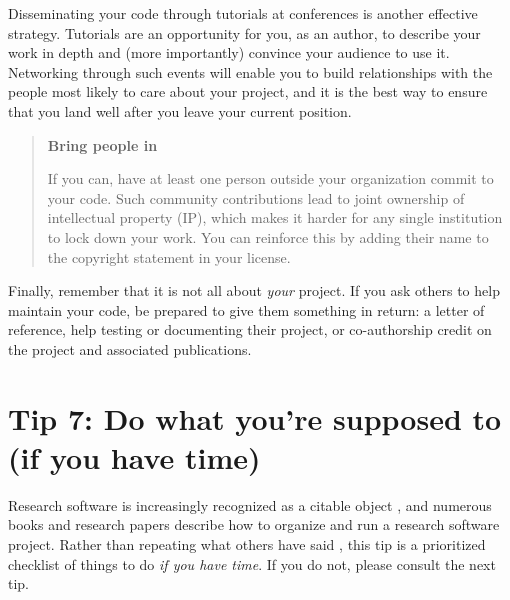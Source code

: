 \documentclass[10pt,letterpaper]{article}
\begin{document}
Disseminating your code through tutorials at conferences is another effective strategy.
Tutorials are an opportunity for you,
as an author,
to describe your work in depth
and (more importantly) convince your audience to use it.
Networking through such events will enable you to build relationships with
the people most likely to care about your project,
and it is the best way to ensure that you land well after you leave your current position.

\begin{quote}
  \noindent
  \textbf{Bring people in}

  If you can, have at least one person outside your organization commit to your code.
  Such community contributions lead to joint ownership of intellectual property (IP),
  which makes it harder for any single institution to lock down your work.
  You can reinforce this by adding their name to the copyright statement in your license.
\end{quote}

Finally,
remember that it is not all about \emph{your} project.
If you ask others to help maintain your code,
be prepared to give them something in return:
a letter of reference,
help testing or documenting their project,
or co-authorship credit on the project and associated publications.

\section*{Tip 7: Do what you're supposed to (if you have time)}

Research software is increasingly recognized as a citable object \cite{Smith2016,Katz2021,Garijo2024},
and numerous books and research papers describe how to organize and run a research software project.
Rather than repeating what others have said
\cite{Sandve2013,Wilson2014,Lee2018a,Dryden2019,Akhmerov2020,Chue2021,Lees2022,Druskat2023,Akhmerov2023,Kumar2023,Struck2023,Reina2024},
this tip is a prioritized checklist of things to do
\emph{if you have time}.
If you do not,
please consult the next tip.
\end{document}
